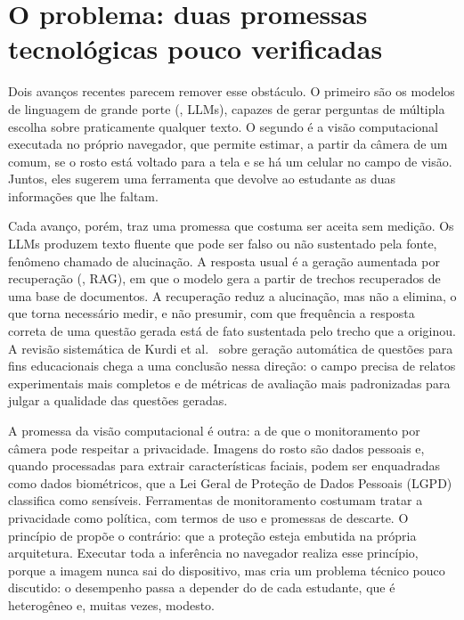 \section{O problema: duas promessas tecnológicas pouco verificadas}

Dois avanços recentes parecem remover esse obstáculo. O primeiro são os modelos de linguagem de grande porte (, LLMs), capazes de gerar perguntas de múltipla escolha sobre praticamente qualquer texto. O segundo é a visão computacional executada no próprio navegador, que permite estimar, a partir da câmera de um  comum, se o rosto está voltado para a tela e se há um celular no campo de visão. Juntos, eles sugerem uma ferramenta que devolve ao estudante as duas informações que lhe faltam.

Cada avanço, porém, traz uma promessa que costuma ser aceita sem medição. Os LLMs produzem texto fluente que pode ser falso ou não sustentado pela fonte, fenômeno chamado de alucinação. A resposta usual é a geração aumentada por recuperação (, RAG), em que o modelo gera a partir de trechos recuperados de uma base de documentos. A recuperação reduz a alucinação, mas não a elimina, o que torna necessário medir, e não presumir, com que frequência a resposta correta de uma questão gerada está de fato sustentada pelo trecho que a originou. A revisão sistemática de Kurdi et al.\ \cite{Kur20} sobre geração automática de questões para fins educacionais chega a uma conclusão nessa direção: o campo precisa de relatos experimentais mais completos e de métricas de avaliação mais padronizadas para julgar a qualidade das questões geradas.

A promessa da visão computacional é outra: a de que o monitoramento por câmera pode respeitar a privacidade. Imagens do rosto são dados pessoais e, quando processadas para extrair características faciais, podem ser enquadradas como dados biométricos, que a Lei Geral de Proteção de Dados Pessoais (LGPD) classifica como sensíveis. Ferramentas de monitoramento costumam tratar a privacidade como política, com termos de uso e promessas de descarte. O princípio de  propõe o contrário: que a proteção esteja embutida na própria arquitetura. Executar toda a inferência no navegador realiza esse princípio, porque a imagem nunca sai do dispositivo, mas cria um problema técnico pouco discutido: o desempenho passa a depender do  de cada estudante, que é heterogêneo e, muitas vezes, modesto.

